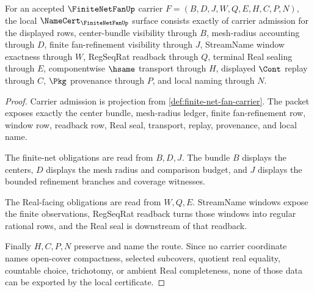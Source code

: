 \begin{theorem}
\label{thm:finite-net-fan-namecert-obligations}
For an accepted $\FiniteNetFanUp$ carrier $F=(B,D,J,W,Q,E,H,C,P,N)$, the local $\NameCert_{\FiniteNetFanUp}$ surface consists exactly of carrier admission for the displayed rows, center-bundle visibility through $B$, mesh-radius accounting through $D$, finite fan-refinement visibility through $J$, StreamName window exactness through $W$, RegSeqRat readback through $Q$, terminal Real sealing through $E$, componentwise $\hsame$ transport through $H$, displayed $\Cont$ replay through $C$, $\Pkg$ provenance through $P$, and local naming through $N$.
\end{theorem}
\begin{proof}
Carrier admission is projection from \autoref{def:finite-net-fan-carrier}. The packet exposes exactly the center bundle, mesh-radius ledger, finite fan-refinement row, window row, readback row, Real seal, transport, replay, provenance, and local name.

The finite-net obligations are read from $B,D,J$. The bundle $B$ displays the centers, $D$ displays the mesh radius and comparison budget, and $J$ displays the bounded refinement branches and coverage witnesses.

The Real-facing obligations are read from $W,Q,E$. StreamName windows expose the finite observations, RegSeqRat readback turns those windows into regular rational rows, and the Real seal is downstream of that readback.

Finally $H,C,P,N$ preserve and name the route. Since no carrier coordinate names open-cover compactness, selected subcovers, quotient real equality, countable choice, trichotomy, or ambient Real completeness, none of those data can be exported by the local certificate.
\end{proof}

